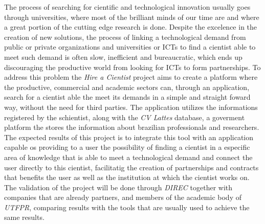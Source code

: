 \begin{abstractutfpr}
    The process of searching for cientific and technological innovation usually goes through universities, where most of the brilliant minds of our time are and where a great portion of the cutting edge research is done. Despite the excelence in the creation of new solutions, the process of linking a technological demand from public or private organizations and universities or ICTs to find a cientist able to meet such demand is often slow, inefficient and bureaucratic, which ends up discouraging the productive world from looking for ICTs to form partnerships. To address this problem the \emph{Hire a Cientist} project aims to create a platform where the productive, commercial and academic sectors can, through an application, search for a cientist able the meet its demands in a simple and straight foward way, without the need for third parties.
    The application utilizes the informations registered by the schientist, along with the \emph{CV Lattes} database, a goverment platform the stores the information about brazilian professionals and researchers. The expected results of this project is to integrate this tool with an application capable os providing to a user the possibility of finding a cientist in a especific area of knowledge that is able to meet a technological demand and connect the user directly to this cientist, facilitatig the creation of partnerships and contracts that benefits the user as well as the institution at which the cientist works on. The validation of the project will be done through \emph{DIREC} together with companies that are already partners, and members of the academic body of \emph{UTFPR}, comparing results with the tools that are usually used to achieve the same results.
\end{abstractutfpr}
